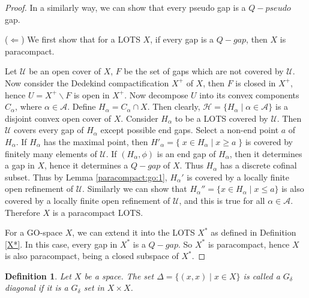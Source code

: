 \documentclass[12pt,oneside,english]{amsbook}
\numberwithin{equation}{section} %
\numberwithin{figure}{section} %
\theoremstyle{plain}
\numberwithin{section}{chapter}
\theoremstyle{plain}
\newtheorem{defn}[thm]{Definition}
\begin{document}
\begin{proof}
  In a similarly way, we can show that every pseudo gap is a $Q-pseudo$ gap.

  ($\Leftarrow$) We first show that for a LOTS $X$, if every gap is a $Q-gap$, then $X$ is paracompact.

  Let $\mathcal{U}$ be an open cover of $X$, $F$ be the set of gaps which are not covered by $\mathcal{U}$. Now consider the Dedekind compactification $X^+$ of $X$, then $F$ is closed in $X^+$, hence $U = X^+ \backslash F$ is open in $X^+$. Now decompose $U$ into its convex components $C_{\alpha}$, where $\alpha \in \mathcal{A}$. Define $H_{\alpha} = C_{\alpha} \cap X$. Then clearly, $\mathcal{H} = \{ H_{\alpha} \; | \; \alpha \in \mathcal{A}  \}$ is a disjoint convex open cover of $X$. Consider $H_{\alpha}$ to be a LOTS covered by $\mathcal{U}$. Then $\mathcal{U}$ covers every gap of $H_{\alpha}$ except possible end gaps. Select a non-end point $a$ of $H_{\alpha}$. If $H_{\alpha}$ has the maximal point, then $H'_{\alpha} = \{ \; x \in H_{\alpha} \; | \; x \geq a \; \}$ is covered by finitely many elements of $\mathcal{U}$. If $(H_{\alpha}, \phi)$ is an end gap of $H_{\alpha}$, then it determines a gap in $X$, hence it determines a $Q-gap$ of $X$. Thus $H_{\alpha}$ has a discrete cofinal subset. Thus by Lemma \ref{paracompact:go:1}, $H_{\alpha}'$ is covered by a locally finite open refinement of $\mathcal{U}$. Similarly we can show that $H_{\alpha}'' = \{x \in H_{\alpha} \; | \; x \leq a \}$ is also covered by a locally finite open refinement of $\mathcal{U}$, and this is true for all $\alpha \in \mathcal{A}$. Therefore $X$ is a paracompact LOTS.

  For a GO-space $X$, we can extend it into the LOTS $X^*$ as defined in Definition \ref{X*}. In this case, every gap in $X^*$ is a $Q-gap$. So $X^*$ is paracompact, hence $X$ is also paracompact, being a closed subspace of $X^*$.
\end{proof}

\begin{defn}
  Let $X$ be a space. The set $\Delta = \{ (x,x) \; | \; x \in X \}$ is called a $G_{\delta}$ diagonal if it is a $G_{\delta}$ set in $X \times X$.
\end{defn}
\end{document}
